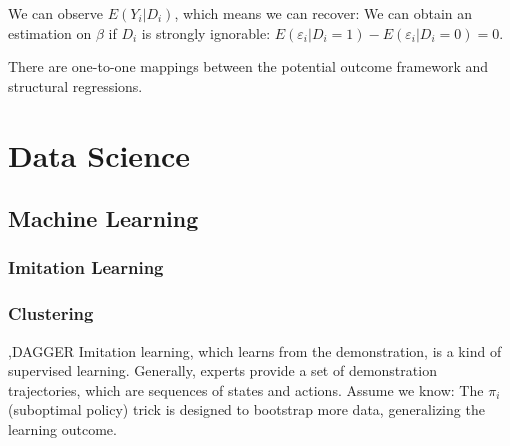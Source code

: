 \documentclass[10pt]{report}
\begin{document}
We can observe $E(Y_i|D_i)$, which means we can recover:
We can obtain an estimation on $\beta$ if $D_i$ is strongly ignorable: $E(\varepsilon_{i} | D_{i} = 1)-E(\varepsilon_{i} | D_{i} = 0)=0$. 
\begin{center}
    There are one-to-one mappings between the potential outcome framework and structural regressions.
\end{center}

\clearpage
\chapter{Data Science}

\section{Machine Learning}

\subsection{Imitation Learning}

\subsection{Clustering}



\sep{DAGGER}
Imitation learning, which learns from the demonstration, is a kind of supervised learning. Generally, experts provide a set of demonstration trajectories, which are sequences of states
and actions. Assume we know:
The $\pi_i$ (suboptimal policy) trick is designed to bootstrap more data, generalizing the learning outcome.
\end{document}
